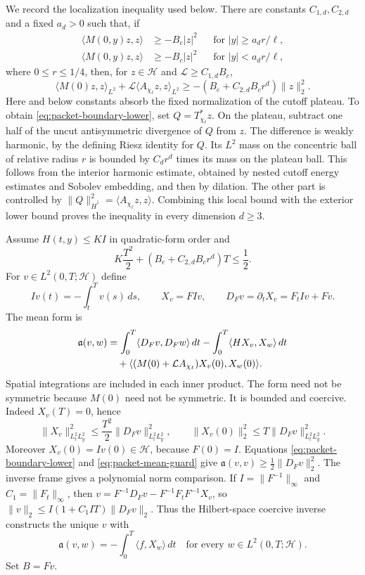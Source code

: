 \documentclass[11pt]{article}
\theoremstyle{definition}
\begin{document}
We record the localization inequality used below. There are constants
$C_{1,d},C_{2,d}$ and a fixed $a_d>0$ such that, if
\begin{align*}
 \langle M(0,y)z,z\rangle&\ge-B_e|z|^2
       &&\text{for }|y|\ge a_dr/\ell,\\
 \langle M(0,y)z,z\rangle&\ge-B_c|z|^2
       &&\text{for }|y|<a_dr/\ell,
\end{align*}
where $0\le r\le1/4$, then, for $z\in\mathcal H$ and
$\mathcal L\ge C_{1,d}B_c$,
\begin{equation}\label{eq:packet-boundary-lower}
 \langle M(0)z,z\rangle_{L^2}
 +\mathcal L\langle A_{\chi_\ell}z,z\rangle_{L^2}
 \ge-(B_e+C_{2,d}B_cr^d)\|z\|_2^2.
\end{equation}
Here and below constants absorb the fixed normalization of the
cutoff plateau. To obtain \eqref{eq:packet-boundary-lower}, set
$Q=T_{\chi_\ell}^{*}z$. On the plateau, subtract one half of the uncut
antisymmetric divergence of $Q$ from $z$. The difference is weakly
harmonic, by the defining Riesz identity for $Q$. Its $L^2$ mass on the
concentric ball of relative radius $r$ is bounded by $C_dr^d$ times its
mass on the plateau ball. This follows from the interior harmonic
estimate, obtained by nested cutoff energy estimates and Sobolev
embedding, and then by dilation. The other part is controlled by
$\|Q\|_{\dot H^1}^2=\langle A_{\chi_\ell}z,z\rangle$.
Combining this local bound with the exterior lower bound proves the
inequality in every dimension $d\ge3$.

Assume $H(t,y)\le K I$ in quadratic-form order and
\begin{equation}\label{eq:packet-mean-guard}
 K\frac{T^2}{2}+(B_e+C_{2,d}B_cr^d)T\le\frac12.
\end{equation}
For $v\in L^2(0,T;\mathcal H)$ define
\[
 Iv(t)=-\int_t^T v(s)\,ds,\qquad X_v=F Iv,\qquad
 D_Fv=\partial_t X_v=F_tIv+Fv.
\]
The mean form is
\begin{align}
 \mathfrak a(v,w)
 &=\int_0^T\langle D_Fv,D_Fw\rangle\,dt
   -\int_0^T\langle HX_v,X_w\rangle\,dt\notag\\
 &\quad+\langle (M(0)+\mathcal L A_{\chi_\ell})X_v(0),
                         X_w(0)\rangle.\label{eq:packet-mean-form}
\end{align}
Spatial integrations are included in each inner product. The form need
not be symmetric because $M(0)$ need not be symmetric. It is bounded and
coercive. Indeed $X_v(T)=0$, hence
\[
 \|X_v\|_{L^2_tL^2_y}^2\le\frac{T^2}{2}\|D_Fv\|_{L^2_tL^2_y}^2,
 \qquad \|X_v(0)\|_2^2\le T\|D_Fv\|_{L^2_tL^2_y}^2.
\]
Moreover $X_v(0)=Iv(0)\in\mathcal H$, because $F(0)=I$.
Equations \eqref{eq:packet-boundary-lower} and
\eqref{eq:packet-mean-guard} give
$\mathfrak a(v,v)\ge\frac12\|D_Fv\|_2^2$.
The inverse frame gives a polynomial norm comparison. If
$I=\|F^{-1}\|_\infty$ and $C_1=\|F_t\|_\infty$, then
$v=F^{-1}D_Fv-F^{-1}F_tF^{-1}X_v$, so
$\|v\|_2\le I(1+C_1IT)\|D_Fv\|_2$.
Thus the Hilbert-space coercive inverse constructs the unique $v$ with
\begin{equation}\label{eq:packet-mean-weak}
 \mathfrak a(v,w)=-\int_0^T\langle f,X_w\rangle\,dt
 \quad\text{for every }w\in L^2(0,T;\mathcal H).
\end{equation}
Set $B=Fv$.
\end{document}

